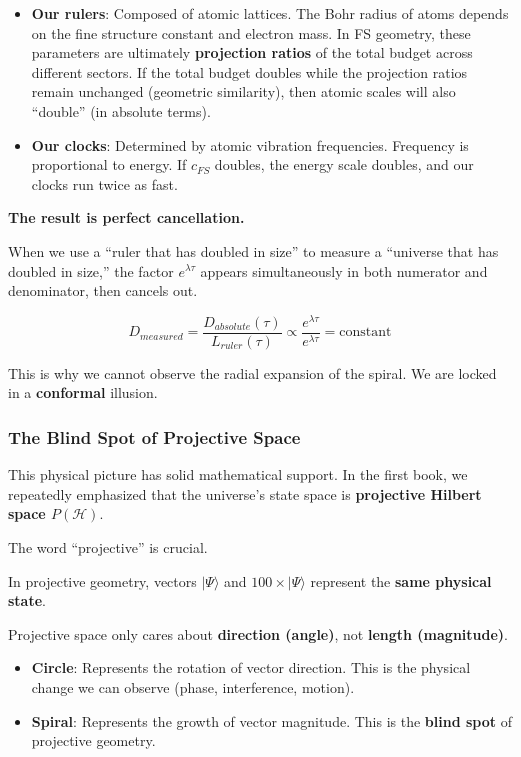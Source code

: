 \begin{itemize}
\item \textbf{Our rulers}: Composed of atomic lattices. The Bohr radius of atoms depends on the fine structure constant and electron mass. In FS geometry, these parameters are ultimately \textbf{projection ratios} of the total budget across different sectors. If the total budget doubles while the projection ratios remain unchanged (geometric similarity), then atomic scales will also ``double'' (in absolute terms).

\item \textbf{Our clocks}: Determined by atomic vibration frequencies. Frequency is proportional to energy. If $c_{FS}$ doubles, the energy scale doubles, and our clocks run twice as fast.
\end{itemize}

\textbf{The result is perfect cancellation.}

When we use a ``ruler that has doubled in size'' to measure a ``universe that has doubled in size,'' the factor $e^{\lambda \tau}$ appears simultaneously in both numerator and denominator, then cancels out.

\[D_{measured} = \frac{D_{absolute}(\tau)}{L_{ruler}(\tau)} \propto \frac{e^{\lambda \tau}}{e^{\lambda \tau}} = \text{constant}\]

This is why we cannot observe the radial expansion of the spiral. We are locked in a \textbf{conformal} illusion.

\subsubsection{The Blind Spot of Projective Space}

This physical picture has solid mathematical support. In the first book, we repeatedly emphasized that the universe's state space is \textbf{projective Hilbert space $P(\mathcal{H})$}.

The word ``projective'' is crucial.

In projective geometry, vectors $|\Psi\rangle$ and $100 \times |\Psi\rangle$ represent the \textbf{same physical state}.

Projective space only cares about \textbf{direction (angle)}, not \textbf{length (magnitude)}.

\begin{itemize}
\item \textbf{Circle}: Represents the rotation of vector direction. This is the physical change we can observe (phase, interference, motion).

\item \textbf{Spiral}: Represents the growth of vector magnitude. This is the \textbf{blind spot} of projective geometry.
\end{itemize}

